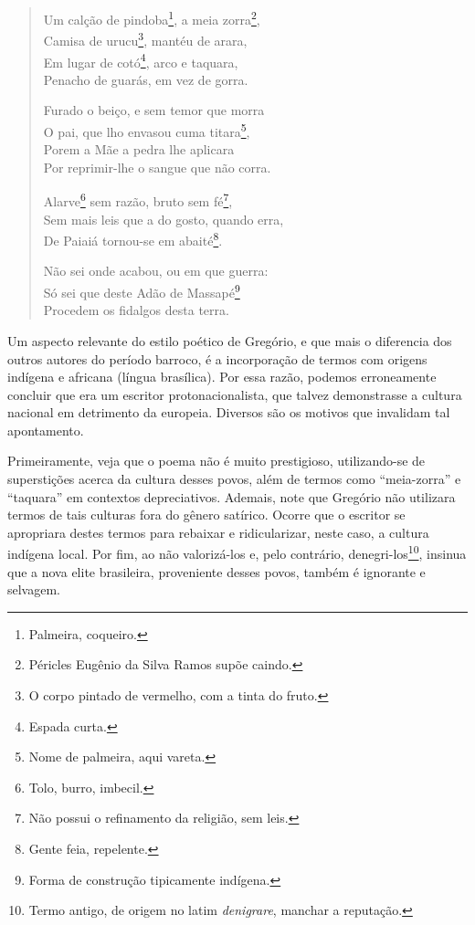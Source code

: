 \begin{verse}
Um calção de pindoba\footnote{Palmeira, coqueiro.}, a meia zorra\footnote{Péricles Eugênio da Silva Ramos supõe caindo.}, \\
Camisa de urucu\footnote{O corpo pintado de vermelho, com a tinta do fruto.}, mantéu de arara, \\
Em lugar de cotó\footnote{Espada curta.}, arco e taquara, \\
Penacho de guarás, em vez de gorra.
			
Furado o beiço, e sem temor que morra \\
O pai, que lho envasou cuma titara\footnote{Nome de palmeira, aqui vareta.}, \\	
Porem a Mãe a pedra lhe aplicara \\
Por reprimir-lhe o sangue que não corra.
			
Alarve\footnote{Tolo, burro, imbecil.} sem razão, bruto sem fé\footnote{Não possui o refinamento da religião, sem leis.}, \\
Sem mais leis que a do gosto, quando erra, \\
De Paiaiá tornou-se em abaité\footnote{Gente feia, repelente.}.
			
Não sei onde acabou, ou em que guerra: \\
Só sei que deste Adão de Massapé\footnote{Forma de construção tipicamente indígena.} \\ 
Procedem os fidalgos desta terra. 
\end{verse}

Um aspecto relevante do estilo poético de Gregório, e que mais o diferencia dos outros autores do período barroco, é a incorporação de termos com origens indígena e africana (língua brasílica). Por essa razão, podemos erroneamente concluir que era um escritor protonacionalista, que talvez demonstrasse a cultura nacional em detrimento da europeia. Diversos são os motivos que invalidam tal apontamento.

Primeiramente, veja que o poema não é muito prestigioso, utilizando-se de superstições acerca da cultura desses povos, além de termos como ``meia-zorra'' e ``taquara'' em contextos depreciativos. Ademais, note que Gregório não utilizara termos de tais culturas fora do gênero satírico. Ocorre que o escritor se apropriara destes termos para rebaixar e ridicularizar, neste caso, a cultura indígena local. Por fim, ao não valorizá-los e, pelo contrário, denegri-los\footnote{Termo antigo, de origem no latim \textit{denigrare}, manchar a reputação.}, insinua que a nova elite brasileira, proveniente desses povos, também é ignorante e selvagem.

